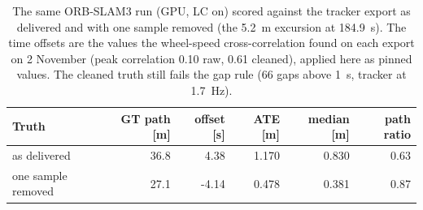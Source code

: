 \begin{table}[htbp]
\centering
\small
\caption[Realv6: raw versus cleaned tracker export.]{The same ORB-SLAM3 run (GPU, LC on) scored against the tracker export as delivered and with one sample removed (the \SI{5.2}{\metre} excursion at \SI{184.9}{\second}). The time offsets are the values the wheel-speed cross-correlation found on each export on 2 November (peak correlation 0.10 raw, 0.61 cleaned), applied here as pinned values. The cleaned truth still fails the gap rule (66 gaps above \SI{1}{\second}, tracker at \SI{1.7}{\hertz}).}
\label{tab:realv6-cleaning}
\begin{tabular}{lrrrrr}
\toprule
Truth & GT path [m] & offset [s] & ATE [m] & median [m] & path ratio \\
\midrule
as delivered & 36.8 & 4.38 & 1.170 & 0.830 & 0.63 \\
one sample removed & 27.1 & -4.14 & 0.478 & 0.381 & 0.87 \\
\bottomrule
\end{tabular}
\end{table}

